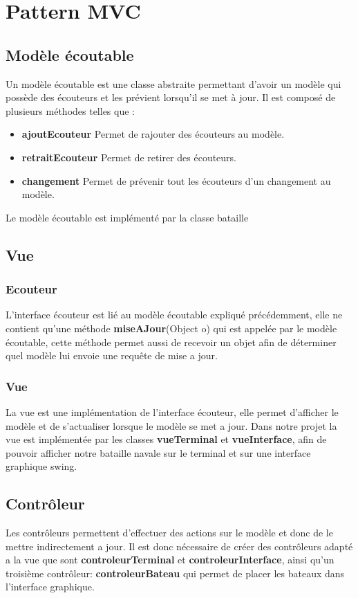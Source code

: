 
\section{Pattern MVC}
\subsection{Modèle écoutable}
Un modèle écoutable est une classe abstraite permettant d'avoir un modèle qui possède des écouteurs et les prévient lorsqu'il se met à jour. Il est composé de plusieurs méthodes telles que :

\begin{itemize}
\item{\textbf{ajoutEcouteur}}
Permet de rajouter des écouteurs au modèle.
\item{\textbf{retraitEcouteur}}
Permet de retirer des écouteurs.
\item{\textbf{changement}}
Permet de prévenir tout les écouteurs d'un changement au modèle.
\end{itemize}

Le modèle écoutable est implémenté par la classe bataille
\subsection{Vue}
\subsubsection{Ecouteur}
L'interface écouteur est lié au modèle écoutable expliqué précédemment,
elle ne contient qu'une méthode \textbf{miseAJour}(Object o) qui est 
appelée par le modèle écoutable, cette méthode permet aussi de recevoir 
un objet afin de déterminer quel modèle lui envoie une requête de mise 
a jour.
\subsubsection{Vue}
La vue est une implémentation de l'interface écouteur, elle permet
d'afficher le modèle et de s'actualiser lorsque le modèle se met a jour.
Dans notre projet la vue est implémentée par les classes \textbf{vueTerminal} et \textbf{vueInterface}, afin de pouvoir afficher notre bataille navale sur le terminal et sur une interface graphique swing.
\subsection{Contrôleur}
Les contrôleurs permettent d'effectuer des actions sur le modèle et donc
de le mettre indirectement a jour. Il est donc nécessaire de créer des
contrôleurs adapté a la vue que sont \textbf{controleurTerminal} et \textbf{controleurInterface}, ainsi qu'un troisième contrôleur: \textbf{controleurBateau} qui permet de placer les bateaux dans l'interface graphique.